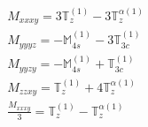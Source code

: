 \documentclass[fleqn,8pt,landscape]{jsarticle}
\begin{document}
\begin{align*}
& M_{xxxy} = 3 \mathbb{T}_{z}^{(1)} - 3 \mathbb{T}_{z}^{\alpha(1)} \\
& M_{yyyz} = - \mathbb{M}_{4s}^{(1)} - 3 \mathbb{T}_{3c}^{(1)} \\
& M_{yyzy} = - \mathbb{M}_{4s}^{(1)} + \mathbb{T}_{3c}^{(1)} \\
& M_{zzxy} = \mathbb{T}_{z}^{(1)} + 4 \mathbb{T}_{z}^{\alpha(1)} \\
& \frac{M_{xxxy}}{3} = \mathbb{T}_{z}^{(1)} - \mathbb{T}_{z}^{\alpha(1)}
\end{align*}
\end{document}
